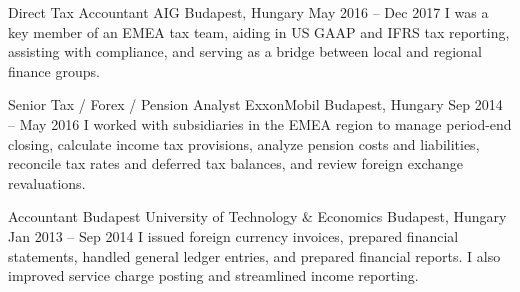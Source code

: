 \begin{cventries}

  \cventry
    {Direct Tax Accountant} %
    {AIG} %
    {Budapest, Hungary} %
    {May 2016 -- Dec 2017} %
    {I was a key member of an EMEA tax team, aiding in US GAAP and IFRS tax reporting, assisting with compliance, and serving as a bridge between local and regional finance groups.} %
    {} %


  \cventry
    {Senior Tax / Forex / Pension Analyst} %
    {ExxonMobil} %
    {Budapest, Hungary} %
    {Sep 2014 -- May 2016} %
    {I worked with subsidiaries in the EMEA region to manage period-end closing, calculate income tax provisions, analyze pension costs and liabilities, reconcile tax rates and deferred tax balances, and review foreign exchange revaluations.} %
    {} %


  \cventry
    {Accountant} %
    {Budapest University of Technology \& Economics} %
    {Budapest, Hungary} %
    {Jan 2013 -- Sep 2014} %
    {I issued foreign currency invoices, prepared financial statements, handled general ledger entries, and prepared financial reports. I also improved service charge posting and streamlined income reporting.} %
    {} %


\end{cventries}
